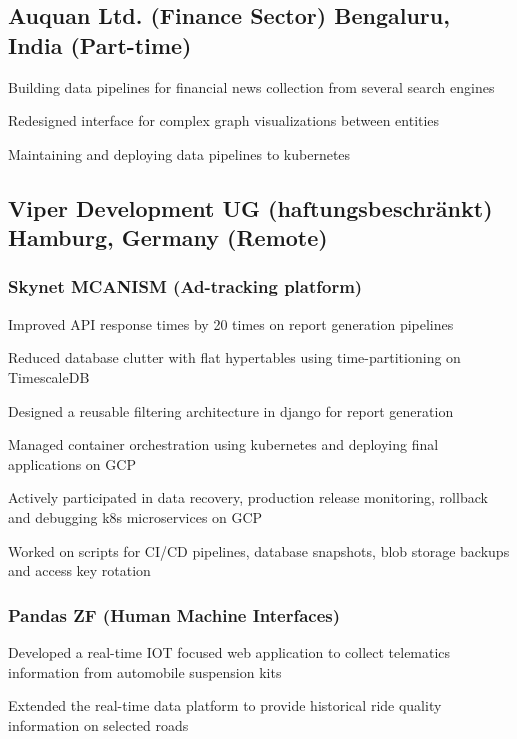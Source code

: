 \documentclass[letter,10pt]{article}
\begin{document}

\subsection{Auquan Ltd. (Finance Sector) \hfill Bengaluru, India (Part-time)}
\begin{zitemize}
\item Building data pipelines for financial news collection from several search engines
\item Redesigned interface for complex graph visualizations between entities
\item Maintaining and deploying data pipelines to kubernetes
\end{zitemize}


\subsection{Viper Development UG (haftungsbeschränkt) \hfill Hamburg, Germany (Remote)}

\vspace{1em}
\subsubsection*{Skynet MCANISM (Ad-tracking platform)}
\begin{zitemize}
\item Improved API response times by 20 times on report generation pipelines
\item Reduced database clutter with flat hypertables using time-partitioning on TimescaleDB
\item Designed a reusable filtering architecture in django for report generation
\item Managed container orchestration using kubernetes and deploying final applications on GCP
\item Actively participated in data recovery, production release monitoring, rollback and debugging k8s microservices on GCP
\item Worked on scripts for CI/CD pipelines, database snapshots, blob storage backups and access key rotation
\end{zitemize}

\subsubsection*{Pandas ZF (Human Machine Interfaces)}
\begin{zitemize}
\item Developed a real-time IOT focused web application to collect telematics information from automobile suspension kits
\item Extended the real-time data platform to provide historical ride quality information on selected roads
\end{zitemize}
\end{document}
